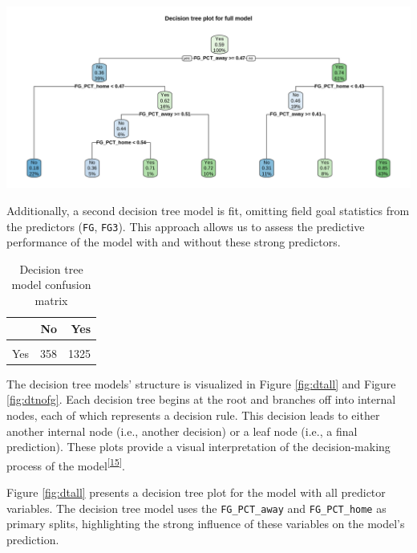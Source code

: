 \documentclass[
  12pt,
  a4paper,
]{article}
\let\origfigure\figure
\let\endorigfigure\endfigure
\renewenvironment{figure}[1][2] {
    \expandafter\origfigure\expandafter[H]
} {
    \endorigfigure
}
\begin{document}
\begin{figure}

{\centering \includegraphics[width=1\linewidth]{latex/plotspng/plot_7} 

}

\caption{Decision tree plot for model with all variables included}\label{fig:dtall}
\end{figure}

Additionally, a second decision tree model is fit, omitting field goal statistics from the predictors (\texttt{FG}, \texttt{FG3}). This approach allows us to assess the predictive performance of the model with and without these strong predictors.

\begin{table}

\caption{\label{tab:confmatdt}Decision tree model confusion matrix}
\centering
\begin{tabular}[t]{lrr}
\toprule
  & No & Yes\\
\midrule
\cellcolor{gray!30}{No} & \cellcolor{gray!30}{893} & \cellcolor{gray!30}{235}\\
Yes & 358 & 1325\\
\bottomrule
\end{tabular}
\end{table}

The decision tree models' structure is visualized in Figure \ref{fig:dtall} and Figure \ref{fig:dtnofg}. Each decision tree begins at the root and branches off into internal nodes, each of which represents a decision rule. This decision leads to either another internal node (i.e., another decision) or a leaf node (i.e., a final prediction). These plots provide a visual interpretation of the decision-making process of the model\textsuperscript{{[}\protect\hyperlink{ref-rpartplot}{15}{]}}.

Figure \ref{fig:dtall} presents a decision tree plot for the model with all predictor variables. The decision tree model uses the \texttt{FG\_PCT\_away} and \texttt{FG\_PCT\_home} as primary splits, highlighting the strong influence of these variables on the model's prediction.
\end{document}

